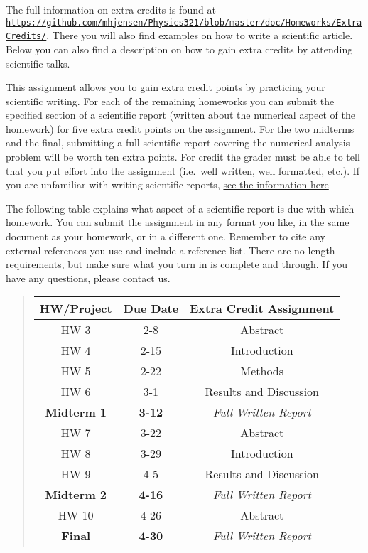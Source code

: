 \documentclass[%
oneside,                 %
final,                   %
10pt]{article}
\begin{document}
The full information on extra credits is found at \href{{https://github.com/mhjensen/Physics321/blob/master/doc/Homeworks/ExtraCredits/}}{\nolinkurl{https://github.com/mhjensen/Physics321/blob/master/doc/Homeworks/ExtraCredits/}}. There you will also find examples on how to write a scientific article. 
Below you can also find a description on how to gain extra credits by attending scientific talks.

This assignment allows you to gain extra credit points by practicing
your scientific writing.  For each of the remaining homeworks you can
submit the specified section of a scientific report (written about the
numerical aspect of the homework) for five extra credit points on the
assignment.  For the two midterms and the final, submitting a full
scientific report covering the numerical analysis problem will be
worth ten extra points.  For credit the grader must be able to tell
that you put effort into the assignment (i.e.~well written, well
formatted, etc.).  If you are unfamiliar with writing scientific
reports, \href{{https://github.com/mhjensen/Physics321/blob/master/doc/Homeworks/ExtraCredits/IntroductionScientificWriting.md}}{see the information here}

The following table explains what aspect of a scientific report is due
with which homework.  You can submit the assignment in any format you
like, in the same document as your homework, or in a different one.
Remember to cite any external references you use and include a
reference list.  There are no length requirements, but make sure what
you turn in is complete and through.  If you have any questions,
please contact us.


\begin{quote}
\begin{tabular}{ccc}
\hline
\multicolumn{1}{c}{ HW/Project } & \multicolumn{1}{c}{ Due Date } & \multicolumn{1}{c}{ Extra Credit Assignment } \\
\hline
HW 3               & 2-8           & Abstract                   \\
HW 4               & 2-15          & Introduction               \\
HW 5               & 2-22          & Methods                    \\
HW 6               & 3-1           & Results and Discussion     \\
\textbf{Midterm 1} & \textbf{3-12} & \emph{Full Written Report} \\
HW 7               & 3-22          & Abstract                   \\
HW 8               & 3-29          & Introduction               \\
HW 9               & 4-5           & Results and Discussion     \\
\textbf{Midterm 2} & \textbf{4-16} & \emph{Full Written Report} \\
HW 10              & 4-26          & Abstract                   \\
\textbf{Final}     & \textbf{4-30} & \emph{Full Written Report} \\
\hline
\end{tabular}
\end{quote}
\end{document}

